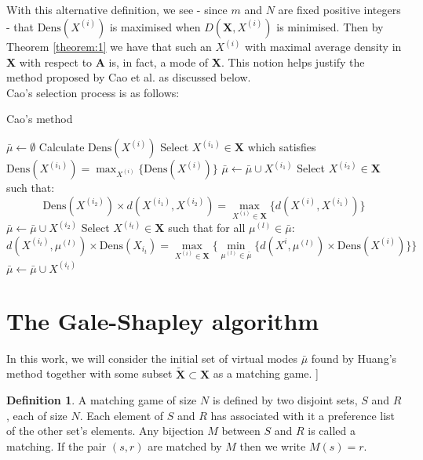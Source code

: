 \documentclass{article}
\theoremstyle{definition}
\newtheorem{definition}{Definition}[section]
\begin{document}
With this alternative definition, we see - since $m$ and $N$ are fixed positive integers - that $\text{Dens}(X^{(i)})$ is maximised when $D(\textbf{X}, X^{(i)})$ is minimised. Then by Theorem \ref{theorem:1} we have that such an $X^{(i)}$ with maximal average density in \textbf{X} with respect to \textbf{A} is, in fact, a mode of \textbf{X}. This notion helps justify the method proposed by Cao et al. as discussed below.\\


Cao's selection process is as follows:

\begin{algorithm}[H]
\caption{Cao's method}\label{alg:cao}
	\begin{algorithmic}[0]
		\State $\bar{\mu} \gets \emptyset$
			\State Calculate $\text{Dens}(X^{(i)})$
		\EndFor
		\State Select $X^{(i_1)} \in \textbf{X}$ which satisfies $\text{Dens}(X^{(i_1)}) = \max_{X^{(i)}} \{\text{Dens}(X^{(i)})\}$
		\State $\bar{\mu} \gets \bar{\mu} \cup X^{(i_1)}$
		\State Select $X^{(i_2)} \in \textbf{X}$ such that: 
		\[
			\text{Dens}(X^{(i_2)}) \times d(X^{(i_1)}, X^{(i_2)}) = \max_{X^{(i)} \in \textbf{X}} \{d(X^{(i)}, X^{(i_1)})\}
		\]
		\State $\bar{\mu} \gets \bar{\mu} \cup X^{(i_2)}$
			\State Select $X^{(i_t)} \in \textbf{X}$ such that for all $\mu^{(l)} \in \bar{\mu}$:
			\[
				d(X^{(i_t)}, \mu^{(l)}) \times \text{Dens}(X_{i_t}) = \max_{X^{(i)} \in \textbf{X}} \{ \min_{\mu^{(l)} \in \bar{\mu}} \{d(X^{i}, \mu^{(l)}) \times \text{Dens}(X^{(i)}) \} \}
			\]
			\State $\bar{\mu} \gets \bar{\mu} \cup X^{(i_t)}$
		\EndWhile
	\end{algorithmic}
\end{algorithm}



\section{The Gale-Shapley algorithm}\label{section:galeshapley}

In this work, we will consider the initial set of virtual modes $\bar{\mu}$ found by Huang's method together with some subset $\tilde{\textbf{X}} \subset \textbf{X}$ as a matching game.
	]
\begin{definition}\label{def:matching-game}
	A matching game of size $N$ is defined by two disjoint sets, $S$ and $R$, each of size $N$. Each element of $S$ and $R$ has associated with it a preference list of the other set's elements. Any bijection $M$ between $S$ and $R$ is called a matching. If the pair $(s,r)$ are matched by $M$ then we write $M(s) = r$.
\end{definition}
\end{document}
